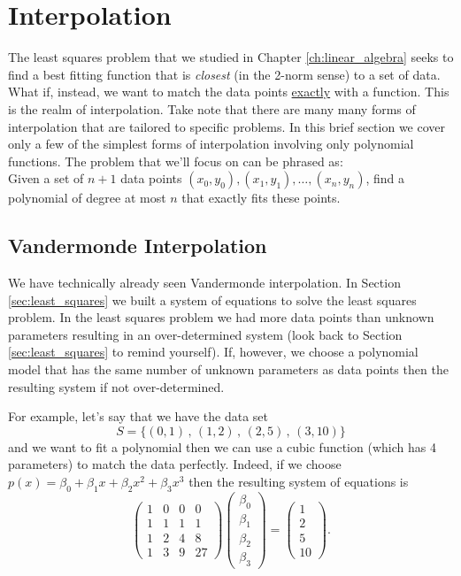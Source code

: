 \newpage\section{Interpolation}
The least squares problem that we studied in Chapter \ref{ch:linear_algebra} seeks to find a best
fitting function that is {\it closest} (in the 2-norm sense) to a set of data.  What if,
instead, we want to match the data points \underline{exactly} with a function. This is the realm of
interpolation.  Take note that there are many many forms of interpolation that are
tailored to specific problems.  In this brief section we cover only a few of the simplest
forms of interpolation involving only polynomial functions.
The problem that we'll focus on can be phrased as:\\  Given a set of $n+1$ data points $(x_0, y_0), (x_1, y_1), \ldots,
(x_n,y_n)$, find a polynomial of degree at most $n$ that exactly fits these points.
\subsection{Vandermonde Interpolation}
We have technically already seen Vandermonde interpolation.  In Section
\ref{sec:least_squares} we built a system of equations to solve the least squares problem.
In the least squares problem we had more data points than unknown parameters resulting in
an over-determined system (look back to Section \ref{sec:least_squares} to remind
yourself).  If, however, we choose a polynomial model that has the same number of unknown
parameters as data points then the resulting system if not over-determined.

For example, let's say that we have the data set 
\[ S = \{ (0,1) \, , \, (1,2) \, , \, (2,5) \, , \, (3,10) \} \]
and we want to fit a polynomial then we can use a cubic function (which has 4 parameters)
to match the data perfectly.  Indeed, if we choose $p(x) = \beta_0 + \beta_1 x + \beta_2
x^2 + \beta_3 x^3$ then the resulting system of equations is
\[ \begin{pmatrix}  1 & 0 & 0 & 0 \\
                    1 & 1 & 1 & 1 \\
                    1 & 2 & 4 & 8 \\
                    1 & 3 & 9 & 27 \end{pmatrix} \begin{pmatrix} \beta_0 \\ \beta_1 \\
                    \beta_2 \\ \beta_3 \end{pmatrix} = \begin{pmatrix} 1 \\ 2 \\ 5 \\ 10
            \end{pmatrix}. \]

